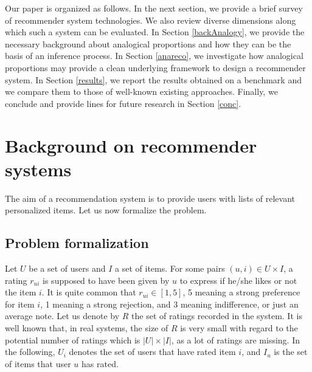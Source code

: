 \documentclass{llncs}
\begin{document}

Our paper is organized as follows. In the next section, we provide a brief
survey of recommender system technologies. We also review diverse dimensions
along which such a system can be evaluated.  In Section \ref{backAnalogy}, we
provide the necessary background about analogical proportions and how they can
be the basis of an inference process. In Section \ref{anareco}, we investigate
how analogical proportions may provide a clean underlying framework to design a
recommender system.  In Section \ref{results}, we report  the results obtained
on a benchmark and we compare them to those of well-known existing approaches.
Finally, we conclude and provide lines for future research in Section
\ref{conc}.


\section{Background on recommender systems}\label{backReco}
The aim of a recommendation system is to provide users with lists of relevant
personalized items.
Let us now formalize the problem.

\subsection{Problem formalization}
Let $U$ be a set of users and $I$ a set of items. For some pairs $(u,i) \in U
\times I$, a rating  $r_{ui}$ is supposed to have been given by $u$ to express
if he/she likes or not the item $i$. 
It is quite common that  $r_{ui} \in [1, 5]$, 5 meaning a strong preference for
item $i$, 1 meaning a strong rejection, and 3 meaning indifference, or just an
average note.  Let us denote by $R$ the set of ratings recorded in the system. It
is well known that, in real systems, the size of $R$ is very small with regard
to the potential number of ratings which is $|U| \times |I|$, as a lot of
ratings are missing. In the following, $U_i$ denotes the set of users that have
rated item $i$, and $I_u$ is the set of items that
user $u$ has rated. 
\end{document}

